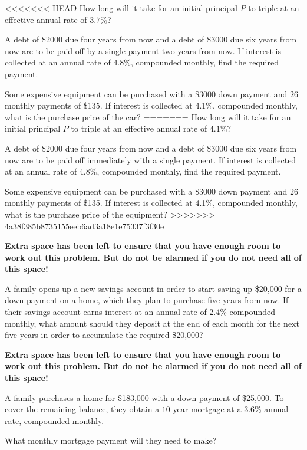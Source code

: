 \documentclass[11pt]{exam}
\begin{document}
\begin{questions}
<<<<<<< HEAD
\question[2] How long will it take for an initial principal $P$ to triple at an effective annual rate of $3.7\%$?
\newpage

\question[3] A debt of \$2000 due four years from now and a debt of \$3000 due six years from now are to be paid off by a single payment two years from now.  If interest is collected at an annual rate of $4.8\%$, compounded monthly, find the required payment.
\newpage

\question[3] Some expensive equipment can be purchased with a \$3000 down payment and $26$ monthly payments of \$135.  If interest is collected at 4.1\%, compounded monthly, what is the purchase price of the car?
=======
\question[2] How long will it take for an initial principal $P$ to triple at an effective annual rate of $4.1\%$?
\newpage

\question[3] A debt of \$2000 due four years from now and a debt of \$3000 due six years from now are to be paid off immediately with a single payment.  If interest is collected at an annual rate of $4.8\%$, compounded monthly, find the required payment.
\newpage

\question[3] Some expensive equipment can be purchased with a \$3000 down payment and $26$ monthly payments of \$135.  If interest is collected at 4.1\%, compounded monthly, what is the purchase price of the equipment?
>>>>>>> 4a38f385b8735155eeb6ad3a18e1e75337f3f30e

\textbf{Extra space has been left to ensure that you have enough room to work out this problem.  But do not be alarmed if you do not need all of this space!}
\newpage

\question[3] A family opens up a new savings account in order to start saving up \$20,000 for a down payment on a home, which they plan to purchase five years from now.  If their savings account earns interest at an annual rate of 2.4\% compounded monthly, what amount should they deposit at the end of each month for the next five years in order to accumulate the required \$20,000?

\textbf{Extra space has been left to ensure that you have enough room to work out this problem.  But do not be alarmed if you do not need all of this space!}
\newpage

\question[4] A family purchases a home for \$183,000 with a down payment of \$25,000.  To cover the remaining balance, they obtain a $10$-year mortgage at a 3.6\% annual rate, compounded monthly.
\begin{compactenum}[(a)]
\item What monthly mortgage payment will they need to make?
\vspace{10cm}


\end{compactenum}
\end{questions}
\end{document}
